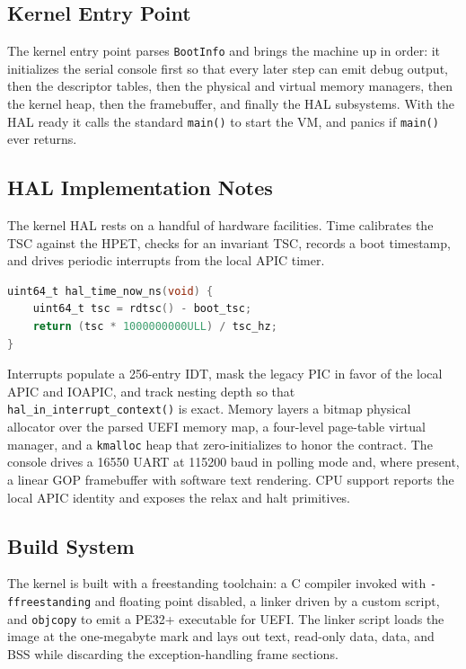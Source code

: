\subsection{Kernel Entry Point}

The kernel entry point parses \texttt{BootInfo} and brings the machine up in
order: it initializes the serial console first so that every later step can emit
debug output, then the descriptor tables, then the physical and virtual memory
managers, then the kernel heap, then the framebuffer, and finally the HAL
subsystems. With the HAL ready it calls the standard \texttt{main()} to start the
VM, and panics if \texttt{main()} ever returns.

\subsection{HAL Implementation Notes}

The kernel HAL rests on a handful of hardware facilities. Time calibrates the
TSC against the HPET, checks for an invariant TSC, records a boot timestamp, and
drives periodic interrupts from the local APIC timer.

\begin{lstlisting}[language=C]
uint64_t hal_time_now_ns(void) {
    uint64_t tsc = rdtsc() - boot_tsc;
    return (tsc * 1000000000ULL) / tsc_hz;
}
\end{lstlisting}

Interrupts populate a 256-entry IDT, mask the legacy PIC in favor of the local
APIC and IOAPIC, and track nesting depth so that \texttt{hal\_in\_interrupt\_context()}
is exact. Memory layers a bitmap physical allocator over the parsed UEFI memory
map, a four-level page-table virtual manager, and a \texttt{kmalloc} heap that
zero-initializes to honor the contract. The console drives a 16550 UART at
115200 baud in polling mode and, where present, a linear GOP framebuffer with
software text rendering. CPU support reports the local APIC identity and exposes
the relax and halt primitives.

\subsection{Build System}

The kernel is built with a freestanding toolchain: a C compiler invoked with
\texttt{-ffreestanding} and floating point disabled, a linker driven by a custom
script, and \texttt{objcopy} to emit a PE32+ executable for UEFI. The linker
script loads the image at the one-megabyte mark and lays out text, read-only
data, data, and BSS while discarding the exception-handling frame sections.

